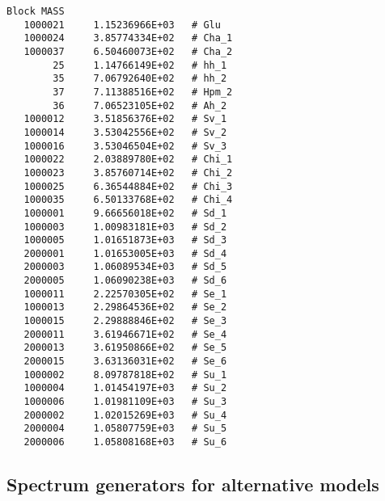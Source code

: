 \documentclass[final,3p,11pt,pdflatex]{elsarticle}
\begin{document}
\begin{lstlisting}
Block MASS
   1000021     1.15236966E+03   # Glu
   1000024     3.85774334E+02   # Cha_1
   1000037     6.50460073E+02   # Cha_2
        25     1.14766149E+02   # hh_1
        35     7.06792640E+02   # hh_2
        37     7.11388516E+02   # Hpm_2
        36     7.06523105E+02   # Ah_2
   1000012     3.51856376E+02   # Sv_1
   1000014     3.53042556E+02   # Sv_2
   1000016     3.53046504E+02   # Sv_3
   1000022     2.03889780E+02   # Chi_1
   1000023     3.85760714E+02   # Chi_2
   1000025     6.36544884E+02   # Chi_3
   1000035     6.50133768E+02   # Chi_4
   1000001     9.66656018E+02   # Sd_1
   1000003     1.00983181E+03   # Sd_2
   1000005     1.01651873E+03   # Sd_3
   2000001     1.01653005E+03   # Sd_4
   2000003     1.06089534E+03   # Sd_5
   2000005     1.06090238E+03   # Sd_6
   1000011     2.22570305E+02   # Se_1
   1000013     2.29864536E+02   # Se_2
   1000015     2.29888846E+02   # Se_3
   2000011     3.61946671E+02   # Se_4
   2000013     3.61950866E+02   # Se_5
   2000015     3.63136031E+02   # Se_6
   1000002     8.09787818E+02   # Su_1
   1000004     1.01454197E+03   # Su_2
   1000006     1.01981109E+03   # Su_3
   2000002     1.02015269E+03   # Su_4
   2000004     1.05807759E+03   # Su_5
   2000006     1.05808168E+03   # Su_6
\end{lstlisting}

\subsection{Spectrum generators for alternative models}
\label{sec:quick-start-alternative-models}
\end{document}
